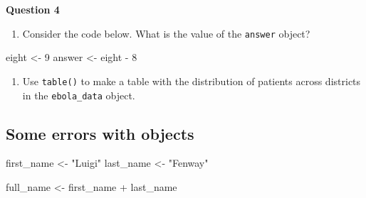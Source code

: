 \documentclass[
  letterpaper,
  DIV=11,
  numbers=noendperiod]{scrreprt}
\newenvironment{Shaded}{\begin{snugshade}}{\end{snugshade}}
\newcommand{\DecValTok}[1]{\textcolor[rgb]{0.68,0.00,0.00}{#1}}
\newcommand{\NormalTok}[1]{\textcolor[rgb]{0.00,0.23,0.31}{#1}}
\newcommand{\OtherTok}[1]{\textcolor[rgb]{0.00,0.23,0.31}{#1}}
\newcommand{\SpecialCharTok}[1]{\textcolor[rgb]{0.37,0.37,0.37}{#1}}
\newcommand{\StringTok}[1]{\textcolor[rgb]{0.13,0.47,0.30}{#1}}
\providecommand{\tightlist}{%
  \setlength{\itemsep}{0pt}\setlength{\parskip}{0pt}}\usepackage{longtable,booktabs,array}
\begin{document}
\begin{tcolorbox}[enhanced jigsaw, titlerule=0mm, colback=white, left=2mm, breakable, opacitybacktitle=0.6, colbacktitle=quarto-callout-tip-color!10!white, colframe=quarto-callout-tip-color-frame, bottomtitle=1mm, opacityback=0, coltitle=black, arc=.35mm, toptitle=1mm, title=\textcolor{quarto-callout-tip-color}{\faLightbulb}\hspace{0.5em}{Practice}, leftrule=.75mm, toprule=.15mm, bottomrule=.15mm, rightrule=.15mm]

\textbf{Question 4}

\begin{enumerate}
\def\labelenumi{\alph{enumi}.}
\tightlist
\item
  Consider the code below. What is the value of the \texttt{answer}
  object?
\end{enumerate}

\begin{Shaded}
\begin{Highlighting}[]
\NormalTok{eight }\OtherTok{\textless{}{-}} \DecValTok{9}
\NormalTok{answer }\OtherTok{\textless{}{-}}\NormalTok{ eight }\SpecialCharTok{{-}} \DecValTok{8}
\end{Highlighting}
\end{Shaded}

\begin{enumerate}
\def\labelenumi{\alph{enumi}.}
\setcounter{enumi}{1}
\tightlist
\item
  Use \texttt{table()} to make a table with the distribution of patients
  across districts in the \texttt{ebola\_data} object.
\end{enumerate}

\end{tcolorbox}

\subsection{Some errors with objects}\label{some-errors-with-objects}

\begin{Shaded}
\begin{Highlighting}[]
\NormalTok{first\_name }\OtherTok{\textless{}{-}} \StringTok{"Luigi"}
\NormalTok{last\_name }\OtherTok{\textless{}{-}} \StringTok{"Fenway"}
\end{Highlighting}
\end{Shaded}

\begin{Shaded}
\begin{Highlighting}[]
\NormalTok{full\_name }\OtherTok{\textless{}{-}}\NormalTok{ first\_name }\SpecialCharTok{+}\NormalTok{ last\_name}
\end{Highlighting}
\end{Shaded}
\end{document}
